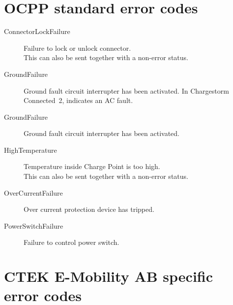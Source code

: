 \pagebreak
\section{OCPP standard error codes}

\begin{description}

\item[ConnectorLockFailure] Failure to lock or unlock connector.\\This can also be sent together with a non-error status.
\item[GroundFailure] Ground fault circuit interrupter has been activated. In Chargestorm Connected~2, indicates an AC fault.
\item[GroundFailure] Ground fault circuit interrupter has been activated.
\item[HighTemperature] Temperature inside Charge Point is too high.\\This can also be sent together with a non-error status.
\item[OverCurrentFailure] Over current protection device has tripped.
\item[PowerSwitchFailure] Failure to control power switch.

\end{description}

\pagebreak
\section{CTEK E-Mobility AB specific error codes}

